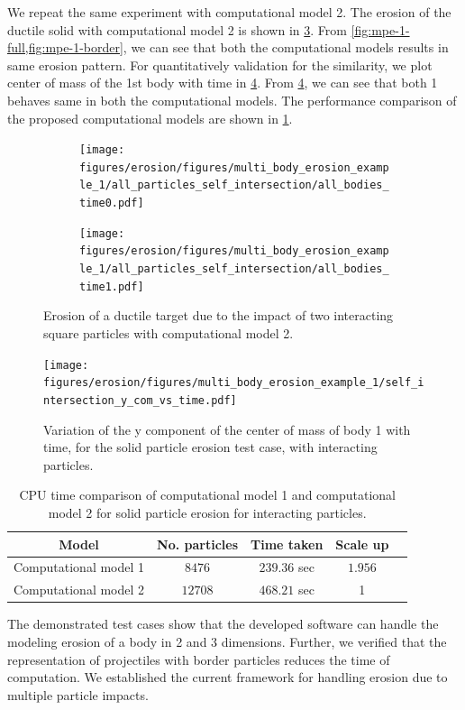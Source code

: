 We repeat the same experiment with computational model 2. The erosion of the
ductile solid with computational model 2 is shown in \cref{fig:mpe-1-full}. From
\cref{fig:mpe-1-full,fig:mpe-1-border}, we can see that both the computational
models results in same erosion pattern. For quantitatively validation for the
similarity, we plot center of mass of the 1st body with time in
\cref{fig:mpe-1-ycom-vs-t}. From \cref{fig:mpe-1-ycom-vs-t}, we can see that
both 1 behaves same in both the computational models. The performance comparison
of the proposed computational models are shown in
\cref{table:mpe-1-time-comparison}.
\begin{figure}[!htpb]
  \centering
  \begin{subfigure}{0.48\textwidth}
    \centering
    \texttt{[image: figures/erosion/figures/multi\_body\_erosion\_example\_1/all\_particles\_self\_intersection/all\_bodies\_time0.pdf]}
    \subcaption{}
    \label{fig:mpe-1-full-a}
  \end{subfigure}
  \begin{subfigure}{0.48\textwidth}
    \centering
    \texttt{[image: figures/erosion/figures/multi\_body\_erosion\_example\_1/all\_particles\_self\_intersection/all\_bodies\_time1.pdf]}
    \subcaption{}
    \label{fig:mpe-1-full-b}
  \end{subfigure}
  \caption{Erosion of a ductile target due to the impact of two interacting
    square particles with computational model 2.}
\label{fig:mpe-1-full}
\end{figure}
\begin{figure}[!htpb]
  \centering
  \texttt{[image: figures/erosion/figures/multi\_body\_erosion\_example\_1/self\_intersection\_y\_com\_vs\_time.pdf]}
  \caption{Variation of the y component of the center of mass of body 1 with
    time, for the solid particle erosion test case, with interacting particles.}
\label{fig:mpe-1-ycom-vs-t}
\end{figure}


\begin{table}[!htpb]
\centering
\begin{tabular}{c c c c c}
  \hline
  Model & No. particles & Time taken & Scale up  \\
  \hline
  Computational model 1 & $8476$ & $239.36$ sec & $1.956$ \\
  Computational model 2 & $12708$ & $468.21$ sec & 1 \\
\end{tabular}
\caption{CPU time comparison of computational model 1 and computational model 2
  for solid particle erosion for interacting particles.}
\label{table:mpe-1-time-comparison}
\end{table}
The demonstrated test cases show that the developed software can handle the
modeling erosion of a body in 2 and 3 dimensions. Further, we verified that the
representation of projectiles with border particles reduces the time of
computation. We established the current framework for handling erosion due to
multiple particle impacts.



